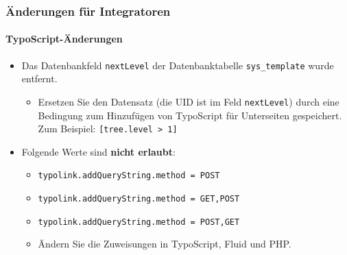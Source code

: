 
\begin{frame}[fragile]
	\frametitle{Änderungen für Integratoren}
	\framesubtitle{TypoScript-Änderungen}

	\begin{itemize}
		\item Das Datenbankfeld \texttt{nextLevel} der Datenbanktabelle
			\texttt{sys\_template} wurde entfernt.

			\begin{itemize}\smaller
				\item[\ding{228}] Ersetzen Sie den Datensatz (die UID ist im Feld \texttt{nextLevel}) durch eine Bedingung zum Hinzufügen von TypoScript für Unterseiten gespeichert. Zum Beispiel: \texttt{[tree.level > 1]}
			\end{itemize}\normalsize

		\item Folgende Werte sind \textbf{nicht erlaubt}:

			\begin{itemize}\smaller
				\item \texttt{typolink.addQueryString.method = POST}
				\item \texttt{typolink.addQueryString.method = GET,POST}
				\item \texttt{typolink.addQueryString.method = POST,GET}
			\end{itemize}\normalsize

			\begin{itemize}\smaller
				\item[\ding{228}] Ändern Sie die Zuweisungen in TypoScript, Fluid und PHP.
			\end{itemize}\normalsize

	\end{itemize}

\end{frame}


